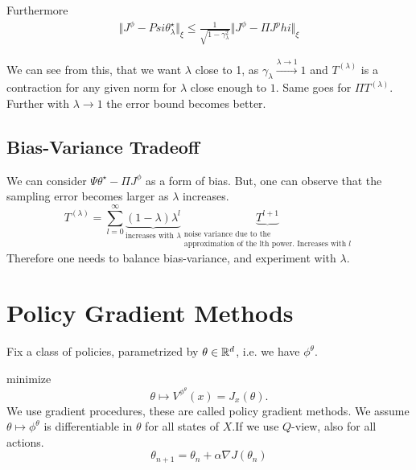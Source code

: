 Furthermore 
\begin{align*}
    \Vert J^\phi-Psi\theta_\lambda^\star\Vert_\xi\leq \frac{1}{\sqrt{1-\gamma_\lambda^2}}\Vert J^\phi-\Pi J^phi\Vert_\xi 
\end{align*}

We can see from this, that we want \(\lambda\) close to 1, as \(\gamma_\lambda\stackrel{\lambda\to 1}{\to}1\)
and \(T^{(\lambda)}\) is a contraction for any given norm for \(\lambda\) close enough to \(1\).
Same goes for \(\Pi T^{(\lambda)}\). Further with \(\lambda\to 1\) the error bound becomes better.

\subsection{Bias-Variance Tradeoff}

We can consider \(\Psi\theta^\star-\Pi J^\phi\) as a form of bias.
But, one can observe that the sampling error becomes larger as \(\lambda\) increases.
\[T^{(\lambda)}=\sum_{l=0}^\infty \underbrace{(1-\lambda)\lambda^l}_{\text{increases with }\lambda} \underbrace{T^{l+1}}_{\substack{\text{noise variance due to the}\\\text{approximation of the lth power. Increases with }l}}\]
Therefore one needs to balance bias-variance, and experiment with \(\lambda\).



\section{Policy Gradient Methods}


Fix a class of policies, parametrized by \(\theta\in \mathbb{R}^d\), i.e. we have \(\phi^\theta\). 

 minimize \[\theta\mapsto V^{\phi^\theta}(x)=J_x(\theta).\]
We use gradient procedures, these are called policy gradient methods. We assume \(\theta\mapsto \phi^\theta\)
is differentiable in \(\theta\) for all states of \(X\).If we use \(Q\)-view, also for all actions.
\begin{equation}\label{eq:pg_update}
    \theta_{n+1}=\theta_n+\alpha\nabla J(\theta_n)  
\end{equation}

